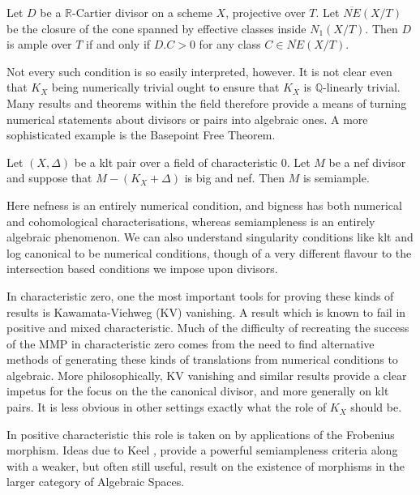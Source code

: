 \documentclass[a4paper,12pt]{book}
\begin{document}
	\begin{theorem*}\cite[Corollary 1.4.11]{La1}
		Let $D$ be a $\mathbb{R}$-Cartier divisor on a scheme $X$, projective over $T$. Let $\overline{NE}(X/T)$ be the closure of the cone spanned by effective classes inside $N_{1}(X/T)$. Then $D$ is ample over $T$ if and only if $D.C >0$ for any class $C \in \overline{NE}(X/T)$.
	\end{theorem*}
	
	Not every such condition is so easily interpreted, however. It is not clear even that $K_{X}$ being numerically trivial ought to ensure that $K_{X}$ is $\mathbb{Q}$-linearly trivial. Many results and theorems within the field therefore provide a means of turning numerical statements about divisors or pairs into algebraic ones. A more sophisticated example is the Basepoint Free Theorem.
	
	\begin{theorem*}\cite[Theorem 3.3]{KM}
		Let $(X,\Delta)$ be a klt pair over a field of characteristic $0$. Let $M$ be a nef divisor and suppose that $M-(K_{X}+\Delta)$ is big and nef. Then $M$ is semiample.
	\end{theorem*}
	
	Here nefness is an entirely numerical condition, and bigness has both numerical and cohomological characterisations, whereas semiampleness is an entirely algebraic phenomenon. We can also understand singularity conditions like klt and log canonical to be numerical conditions, though of a very different flavour to the intersection based conditions we impose upon divisors.
	
	In characteristic zero, one the most important tools for proving these kinds of results is Kawamata-Viehweg (KV) vanishing. A result which is known to fail in positive and mixed characteristic. Much of the difficulty of recreating the success of the MMP in characteristic zero comes from the need to find alternative methods of generating these kinds of translations from numerical conditions to algebraic. More philosophically, KV vanishing and similar results provide a clear impetus for the focus on the the canonical divisor, and more generally on klt pairs. It is less obvious in other settings exactly what the role of $K_{X}$ should be.
	
	In positive characteristic this role is taken on by applications of the Frobenius morphism. Ideas due to Keel \cite{Keel}, provide a powerful semiampleness criteria along with a weaker, but often still useful, result on the existence of morphisms in the larger category of Algebraic Spaces. 
	
\end{document}
